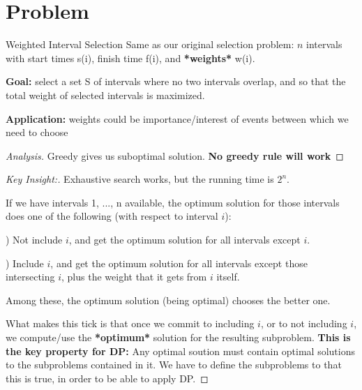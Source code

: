 \documentclass[openany]{article}
\begin{document}
\section*{Problem}
\begin{problem*}{Weighted Interval Selection}
    Same as our original selection problem:
    $n$ intervals with start times s(i), finish time f(i), and \textbf{*weights*} w(i).

    \textbf{Goal:} select a set S of intervals where no two intervals overlap, and so that the total weight of selected intervals is maximized.

    \textbf{Application:} weights could be importance/interest of events between which we need to choose
\end{problem*}

\begin{proof}[Analysis]{}
		\renewcommand{\qedsymbol}{} %
        Greedy gives us suboptimal solution. \textbf{No greedy rule will work}
\end{proof}
\begin{proof}[Key Insight:]{}
		\renewcommand{\qedsymbol}{} %
        Exhaustive search works, but the running time is $2^n$. 

        If we have intervals 1, ..., n available, the optimum solution for those intervals does one of the following (with respect to interval $i$):

        ) Not include $i$, and get the optimum solution for all intervals except $i$.
        
        ) Include $i$, and get the optimum solution for all intervals except those intersecting $i$, plus the weight that it gets from $i$ itself.

        \qquad Among these, the optimum solution (being optimal) chooses the better one.

        What makes this tick is that once we commit to including $i$, or to not including $i$, we compute/use the \textbf{*optimum*} solution for the resulting subproblem. \textbf{This is the key property for DP:} Any optimal soution must contain optimal solutions to the subproblems contained in it. We have to define the subproblems to that this is true, in order to be able to apply DP.
\end{proof}
\end{document}

